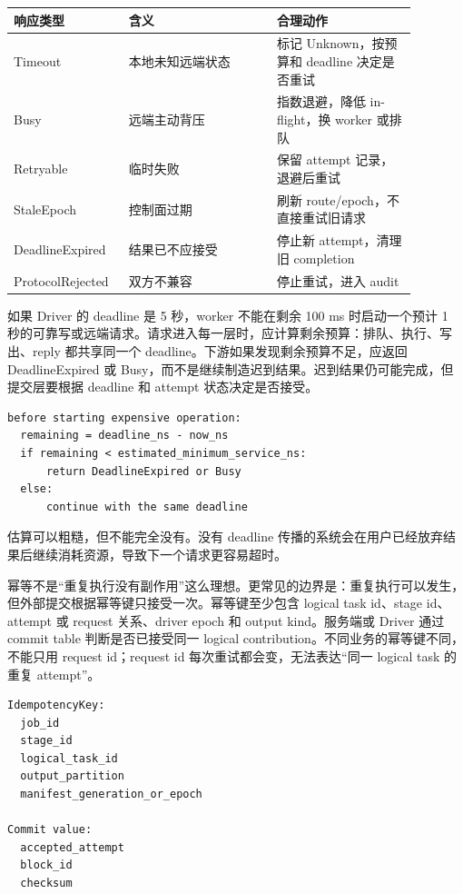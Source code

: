 \begin{center}
\begin{tabular}{p{0.22\linewidth}p{0.34\linewidth}p{0.32\linewidth}}
\toprule
响应类型 & 含义 & 合理动作 \\
\midrule
Timeout & 本地未知远端状态 & 标记 Unknown，按预算和 deadline 决定是否重试 \\
Busy & 远端主动背压 & 指数退避，降低 in-flight，换 worker 或排队 \\
Retryable & 临时失败 & 保留 attempt 记录，退避后重试 \\
StaleEpoch & 控制面过期 & 刷新 route/epoch，不直接重试旧请求 \\
DeadlineExpired & 结果已不应接受 & 停止新 attempt，清理旧 completion \\
ProtocolRejected & 双方不兼容 & 停止重试，进入 audit \\
\bottomrule
\end{tabular}
\end{center}

如果 Driver 的 deadline 是 5 秒，worker 不能在剩余 100 ms 时启动一个预计 1 秒的可靠写或远端请求。请求进入每一层时，应计算剩余预算：排队、执行、写出、reply 都共享同一个 deadline。下游如果发现剩余预算不足，应返回 DeadlineExpired 或 Busy，而不是继续制造迟到结果。迟到结果仍可能完成，但提交层要根据 deadline 和 attempt 状态决定是否接受。

\begin{lstlisting}[numbers=none,caption={deadline 传播的判定形态}]
before starting expensive operation:
  remaining = deadline_ns - now_ns
  if remaining < estimated_minimum_service_ns:
      return DeadlineExpired or Busy
  else:
      continue with the same deadline
\end{lstlisting}

估算可以粗糙，但不能完全没有。没有 deadline 传播的系统会在用户已经放弃结果后继续消耗资源，导致下一个请求更容易超时。

幂等不是“重复执行没有副作用”这么理想。更常见的边界是：重复执行可以发生，但外部提交根据幂等键只接受一次。幂等键至少包含 logical task id、stage id、attempt 或 request 关系、driver epoch 和 output kind。服务端或 Driver 通过 commit table 判断是否已接受同一 logical contribution。不同业务的幂等键不同，不能只用 request id；request id 每次重试都会变，无法表达“同一 logical task 的重复 attempt”。

\begin{lstlisting}[numbers=none,caption={幂等提交键的形态}]
IdempotencyKey:
  job_id
  stage_id
  logical_task_id
  output_partition
  manifest_generation_or_epoch

Commit value:
  accepted_attempt
  block_id
  checksum
\end{lstlisting}

